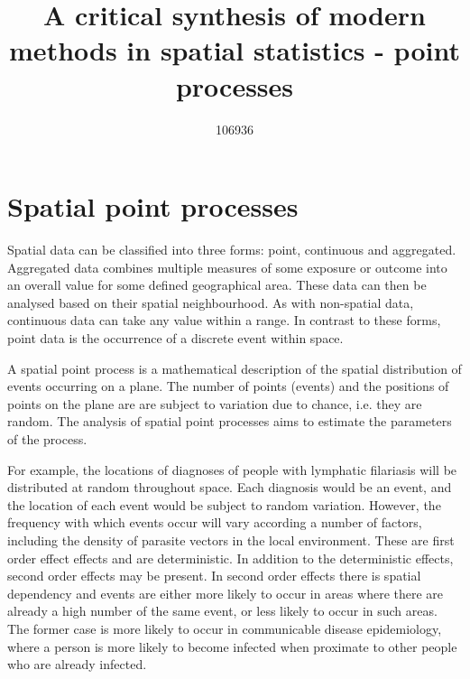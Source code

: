 \documentclass[11pt,a4paper]{article}
\author{106936}
\title{A critical synthesis of modern methods in spatial statistics - point processes}
\begin{document}
\maketitle
\section{Spatial point processes}
Spatial data can be classified into three forms: point, continuous and aggregated. 
Aggregated data combines multiple measures of some exposure or outcome into an overall value for some defined geographical area. 
These data can then be analysed based on their spatial neighbourhood. 
As with non-spatial data, continuous data can take any value within a range. 
In contrast to these forms, point data is the occurrence of a discrete event within space. 

A spatial point process is a mathematical description of the spatial distribution of events occurring on a plane. 
The number of points (events) and the positions of points on the plane are are subject to variation due to chance, i.e. they are random. 
The analysis of spatial point processes aims to estimate the parameters of the process. 

For example, the locations of diagnoses of people with lymphatic filariasis will be distributed at random throughout space. 
Each diagnosis would be an event, and the location of each event would be subject to random variation. 
However, the frequency with which events occur will vary according a number of factors, including the density of parasite vectors in the local environment. 
These are first order effect effects and are deterministic. 
In addition to the deterministic effects, second order effects may be present. 
In second order effects there is spatial dependency and events are either more likely to occur in areas where there are already a high number of the same event, or less likely to occur in such areas. 
The former case is more likely to occur in communicable disease epidemiology, where a person is more likely to become infected when proximate to other people who are already infected. 
\end{document}
